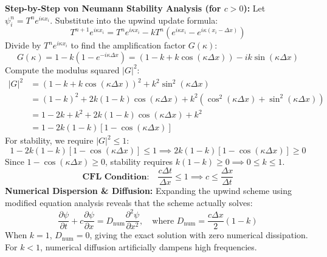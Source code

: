 \documentclass{article}
\begin{document}
\textbf{Step-by-Step von Neumann Stability Analysis (for $c > 0$):}
Let $\psi_i^n = T^n e^{i \kappa x_i}$. Substitute into the upwind update formula:
$$T^{n+1} e^{i \kappa x_i} = T^n e^{i \kappa x_i} - k T^n \left( e^{i \kappa x_i} - e^{i \kappa (x_i - \Delta x)} \right)$$
Divide by $T^n e^{i \kappa x_i}$ to find the amplification factor $G(\kappa)$:
$$G(\kappa) = 1 - k \left( 1 - e^{-i \kappa \Delta x} \right) = (1 - k + k \cos(\kappa \Delta x)) - i k \sin(\kappa \Delta x)$$
Compute the modulus squared $|G|^2$:
\begin{align*}
|G|^2 &= (1 - k + k \cos(\kappa \Delta x))^2 + k^2 \sin^2(\kappa \Delta x) \\
&= (1 - k)^2 + 2k(1-k)\cos(\kappa \Delta x) + k^2(\cos^2(\kappa \Delta x) + \sin^2(\kappa \Delta x)) \\
&= 1 - 2k + k^2 + 2k(1-k)\cos(\kappa \Delta x) + k^2 \\
&= 1 - 2k(1-k) [1 - \cos(\kappa \Delta x)]
\end{align*}
For stability, we require $|G|^2 \le 1$:
$$1 - 2k(1-k) [1 - \cos(\kappa \Delta x)] \le 1 \implies 2k(1-k) [1 - \cos(\kappa \Delta x)] \ge 0$$
Since $1 - \cos(\kappa \Delta x) \ge 0$, stability requires $k(1-k) \ge 0 \implies 0 \le k \le 1$.
$$\textbf{CFL Condition:} \quad \frac{c \Delta t}{\Delta x} \le 1 \implies c \le \frac{\Delta x}{\Delta t}$$
\textbf{Numerical Dispersion \& Diffusion:}
Expanding the upwind scheme using modified equation analysis reveals that the scheme actually solves:
$$\frac{\partial \psi}{\partial t} + c \frac{\partial \psi}{\partial x} = D_{\text{num}} \frac{\partial^2 \psi}{\partial x^2}, \quad \text{where } D_{\text{num}} = \frac{c \Delta x}{2}(1 - k)$$
When $k = 1$, $D_{\text{num}} = 0$, giving the exact solution with zero numerical dissipation. For $k < 1$, numerical diffusion artificially dampens high frequencies.
\newpage
\end{document}
